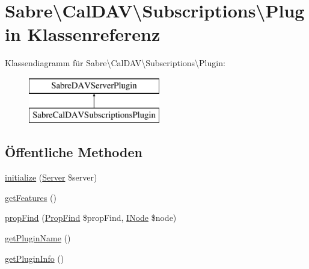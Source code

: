 \hypertarget{class_sabre_1_1_cal_d_a_v_1_1_subscriptions_1_1_plugin}{}\section{Sabre\textbackslash{}Cal\+D\+AV\textbackslash{}Subscriptions\textbackslash{}Plugin Klassenreferenz}
\label{class_sabre_1_1_cal_d_a_v_1_1_subscriptions_1_1_plugin}
Klassendiagramm für Sabre\textbackslash{}Cal\+D\+AV\textbackslash{}Subscriptions\textbackslash{}Plugin\+:\begin{figure}[H]
\begin{center}
\leavevmode
\includegraphics[height=2.000000cm]{class_sabre_1_1_cal_d_a_v_1_1_subscriptions_1_1_plugin}
\end{center}
\end{figure}
\subsection*{Öffentliche Methoden}
\begin{DoxyCompactItemize}
\item 
\mbox{\hyperlink{class_sabre_1_1_cal_d_a_v_1_1_subscriptions_1_1_plugin_accf9fe37641939ea1d2557f45a21ae1b}{initialize}} (\mbox{\hyperlink{class_sabre_1_1_d_a_v_1_1_server}{Server}} \$server)
\item 
\mbox{\hyperlink{class_sabre_1_1_cal_d_a_v_1_1_subscriptions_1_1_plugin_ad0b77dceec94b34d4292cb5d13e22099}{get\+Features}} ()
\item 
\mbox{\hyperlink{class_sabre_1_1_cal_d_a_v_1_1_subscriptions_1_1_plugin_a3865b70ee78dc11b003e28cbf4343812}{prop\+Find}} (\mbox{\hyperlink{class_sabre_1_1_d_a_v_1_1_prop_find}{Prop\+Find}} \$prop\+Find, \mbox{\hyperlink{interface_sabre_1_1_d_a_v_1_1_i_node}{I\+Node}} \$node)
\item 
\mbox{\hyperlink{class_sabre_1_1_cal_d_a_v_1_1_subscriptions_1_1_plugin_a17d0df9b87139bfe08e8b6b8dd3d978c}{get\+Plugin\+Name}} ()
\item 
\mbox{\hyperlink{class_sabre_1_1_cal_d_a_v_1_1_subscriptions_1_1_plugin_a47f2d39181c7798dfc956b33f9376266}{get\+Plugin\+Info}} ()
\end{DoxyCompactItemize}


